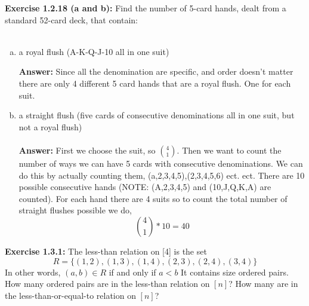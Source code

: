 \documentclass{amsart}
\begin{document}
\noindent\textbf{Exercise 1.2.18 (a and b): } Find the number of 5-card hands, dealt from a standard 52-card deck, that contain: \\\\

\begin{enumerate}[(a)]
\item a royal flush (A-K-Q-J-10 all in one suit)

\noindent \textbf{Answer:}
Since all the denomination are specific, and order doesn't matter there are only 4 different 5 card hands that are a royal flush. One for each suit.

\vspace{1in}

\item a straight flush (five cards of consecutive denominations all in one suit, but not a royal flush)\\\\
\noindent \textbf{Answer:}
First we choose the suit, so $4 \choose 1$. Then we want to count the number of ways we can have 5 cards with consecutive denominations. We can do this by actually counting them, (a,2,3,4,5),(2,3,4,5,6) ect. ect. There are 10 possible consecutive hands (NOTE: (A,2,3,4,5) and (10,J,Q,K,A) are counted). For each hand there are 4 suits so to count the total number of straight flushes possible we do,\\
\begin{equation}
{{4} \choose {1}}*10=40
\end{equation} 
\vspace{1in}
\end{enumerate}

\noindent\textbf{Exercise 1.3.1: } The less-than relation on [4] is the set
$$R=\{(1,2),(1,3),(1,4),(2,3),(2,4),(3,4)\}$$
In other words, $(a,b) \in R$ if and only if $a < b$ It contains size ordered pairs. How many ordered pairs are in the less-than relation on $[n]$? How many are in the less-than-or-equal-to relation on $[n]$?\\\\
\end{document}
